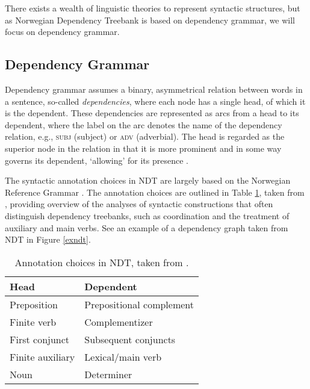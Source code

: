 \documentclass[a4paper,12pt,english]{book}
\begin{document}
There exists a wealth of linguistic theories to represent syntactic structures,
but as Norwegian Dependency Treebank is based on dependency grammar, we will
focus on dependency grammar.

\subsection{Dependency Grammar}
Dependency grammar assumes a binary, asymmetrical relation between words in a
sentence, so-called \emph{dependencies}, where each node has a single head, of
which it is the dependent. These dependencies are represented as arcs from a
head to its dependent, where the label on the arc denotes the name of the
dependency relation, e.g., \textsc{subj} (subject) or \textsc{adv} (adverbial).
The head is regarded as the superior node in the relation in that it is more
prominent and in some way governs its dependent, `allowing' for its presence
\cite{Niv:05}.

The syntactic annotation choices in NDT are largely based on the
Norwegian Reference Grammar \cite{Faa:Lie:Van:97}. The annotation choices are
outlined in Table \ref{ndtannotation}, taken from ,
providing overview of the analyses of syntactic constructions that often
distinguish dependency treebanks, such as coordination and the treatment of
auxiliary and main verbs. See an example of a dependency graph taken from NDT
in Figure \ref{exndt}.

\begin{table}
    \centering
    \smaller[0.5]
    \begin{tabular}{@{}ll@{}}
        \toprule
        \textbf{Head} & \textbf{Dependent} \\
        \midrule
        Preposition & Prepositional complement \\
        Finite verb & Complementizer \\
        First conjunct & Subsequent conjuncts \\
        Finite auxiliary & Lexical/main verb \\
        Noun & Determiner \\
        \bottomrule
    \end{tabular}
    \caption{Annotation choices in NDT, taken from
        \protect{}.}
    \label{ndtannotation}
\end{table}
\end{document}
